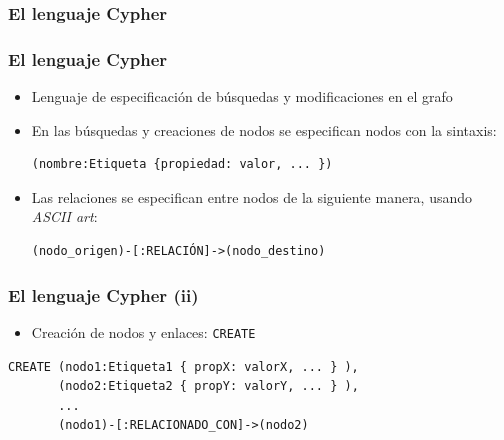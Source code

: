 \documentclass[14pt]{beamer}
\begin{document}



\subsubsection{El lenguaje Cypher}

\begin{frame}[fragile]
  \frametitle{El lenguaje Cypher}
  \begin{itemize}
\item Lenguaje de especificación de búsquedas y modificaciones en el
  grafo
\item En las búsquedas y creaciones de nodos se especifican nodos con la
  sintaxis:
\begin{lstlisting}[language=cypher]
(nombre:Etiqueta {propiedad: valor, ... })
\end{lstlisting}

\item Las relaciones se especifican entre nodos de la siguiente manera,
  usando {\em ASCII art}:

\begin{lstlisting}[language=cypher]
(nodo_origen)-[:RELACIÓN]->(nodo_destino)
\end{lstlisting}
  \end{itemize}
\end{frame}

\begin{frame}[fragile]
  \frametitle{El lenguaje Cypher (ii)}
  \begin{itemize}
  \item Creación de nodos y enlaces: {\tt CREATE}
  \end{itemize}

\begin{lstlisting}[language=cypher]
CREATE (nodo1:Etiqueta1 { propX: valorX, ... } ),
       (nodo2:Etiqueta2 { propY: valorY, ... } ),
       ...
       (nodo1)-[:RELACIONADO_CON]->(nodo2)
\end{lstlisting}
\end{frame}
\end{document}
